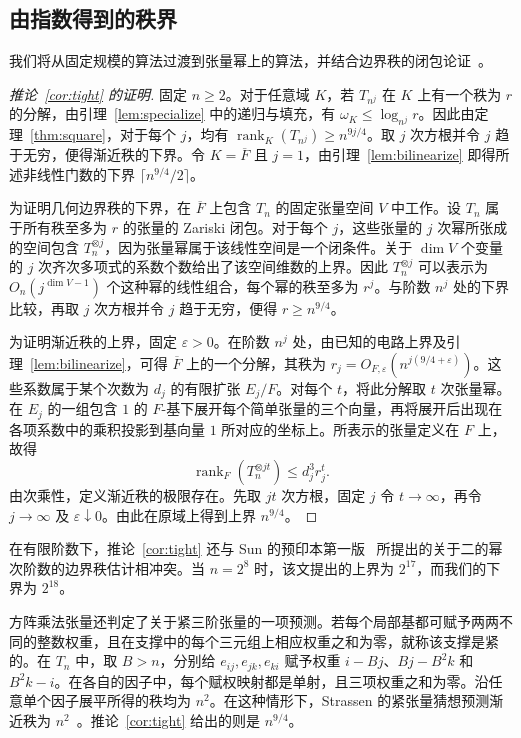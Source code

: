 \subsection{由指数得到的秩界}\label{sec:finite-ranks}

我们将从固定规模的算法过渡到张量幂上的算法，并结合边界秩的闭包论证~\cite{bini,bcs,spectrum}。

\begin{proof}[推论~\ref{cor:tight} 的证明]
固定 \(n\ge2\)。对于任意域 \(K\)，若 \(T_{n^j}\) 在 \(K\) 上有一个秩为 \(r\) 的分解，由引理~\ref{lem:specialize} 中的递归与填充，有 \(\omega_K\le\log_{n^j} r\)。因此由定理~\ref{thm:square}，对于每个 \(j\)，均有 \(\operatorname{rank}_K(T_{n^j})\ge n^{9j/4}\)。取 \(j\) 次方根并令 \(j\) 趋于无穷，便得渐近秩的下界。令 \(K=\overline F\) 且 \(j=1\)，由引理~\ref{lem:bilinearize} 即得所述非线性门数的下界 \(\lceil n^{9/4}/2\rceil\)。

为证明几何边界秩的下界，在 \(\overline F\) 上包含 \(T_n\) 的固定张量空间 \(V\) 中工作。设 \(T_n\) 属于所有秩至多为 \(r\) 的张量的 Zariski 闭包。对于每个 \(j\)，这些张量的 \(j\) 次幂所张成的空间包含 \(T_n^{\otimes j}\)，因为张量幂属于该线性空间是一个闭条件。关于 \(\dim V\) 个变量的 \(j\) 次齐次多项式的系数个数给出了该空间维数的上界。因此 \(T_n^{\otimes j}\) 可以表示为 \(O_n(j^{\dim V-1})\) 个这种幂的线性组合，每个幂的秩至多为 \(r^j\)。与阶数 \(n^j\) 处的下界比较，再取 \(j\) 次方根并令 \(j\) 趋于无穷，便得 \(r\ge n^{9/4}\)。

为证明渐近秩的上界，固定 \(\varepsilon>0\)。在阶数 \(n^j\) 处，由已知的电路上界及引理~\ref{lem:bilinearize}，可得 \(\overline F\) 上的一个分解，其秩为 \(r_j=O_{F,\varepsilon}(n^{j(9/4+\varepsilon)})\)。这些系数属于某个次数为 \(d_j\) 的有限扩张 \(E_j/F\)。对每个 \(t\)，将此分解取 \(t\) 次张量幂。在 \(E_j\) 的一组包含 \(1\) 的 \(F\)-基下展开每个简单张量的三个向量，再将展开后出现在各项系数中的乘积投影到基向量 \(1\) 所对应的坐标上。所表示的张量定义在 \(F\) 上，故得
\[
        \operatorname{rank}_F(T_n^{\otimes jt})\le d_j^3 r_j^t .
\]
由次乘性，定义渐近秩的极限存在。先取 \(jt\) 次方根，固定 \(j\) 令 \(t\to\infty\)，再令 \(j\to\infty\) 及 \(\varepsilon\downarrow0\)。由此在原域上得到上界 \(n^{9/4}\)。
\end{proof}

在有限阶数下，推论~\ref{cor:tight} 还与 Sun 的预印本第一版~\cite{Sun} 所提出的关于二的幂次阶数的边界秩估计相冲突。当 $n=2^8$ 时，该文提出的上界为 $2^{17}$，而我们的下界为 $2^{18}$。

方阵乘法张量还判定了关于紧三阶张量的一项预测。若每个局部基都可赋予两两不同的整数权重，且在支撑中的每个三元组上相应权重之和为零，就称该支撑是紧的。在 \(T_n\) 中，取 \(B>n\)，分别给 \(e_{ij},e_{jk},e_{ki}\) 赋予权重 \(i-Bj\)、\(Bj-B^2k\) 和 \(B^2k-i\)。在各自的因子中，每个赋权映射都是单射，且三项权重之和为零。沿任意单个因子展平所得的秩均为 \(n^2\)。在这种情形下，Strassen 的紧张量猜想预测渐近秩为 \(n^2\)~\cite[猜想~5.3]{Strassen1994}。推论~\ref{cor:tight} 给出的则是 \(n^{9/4}\)。

